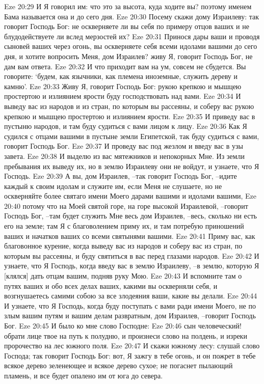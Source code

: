Eze 20:29  И Я говорил им: что это за высота, куда ходите вы? поэтому именем Бама называется она и до сего дня.
Eze 20:30  Посему скажи дому Израилеву: так говорит Господь Бог: не оскверняете ли вы себя по примеру отцов ваших и не блудодействуете ли вслед мерзостей их?
Eze 20:31  Принося дары ваши и проводя сыновей ваших через огонь, вы оскверняете себя всеми идолами вашими до сего дня, и хотите вопросить Меня, дом Израилев? живу Я, говорит Господь Бог, не дам вам ответа.
Eze 20:32  И что приходит вам на ум, совсем не сбудется. Вы говорите: `будем, как язычники, как племена иноземные, служить дереву и камню'.
Eze 20:33  Живу Я, говорит Господь Бог: рукою крепкою и мышцею простертою и излиянием ярости буду господствовать над вами.
Eze 20:34  И выведу вас из народов и из стран, по которым вы рассеяны, и соберу вас рукою крепкою и мышцею простертою и излиянием ярости.
Eze 20:35  И приведу вас в пустыню народов, и там буду судиться с вами лицом к лицу.
Eze 20:36  Как Я судился с отцами вашими в пустыне земли Египетской, так буду судиться с вами, говорит Господь Бог.
Eze 20:37  И проведу вас под жезлом и введу вас в узы завета.
Eze 20:38  И выделю из вас мятежников и непокорных Мне. Из земли пребывания их выведу их, но в землю Израилеву они не войдут, и узнаете, что Я Господь.
Eze 20:39  А вы, дом Израилев, --так говорит Господь Бог, --идите каждый к своим идолам и служите им, если Меня не слушаете, но не оскверняйте более святаго имени Моего дарами вашими и идолами вашими,
Eze 20:40  потому что на Моей святой горе, на горе высокой Израилевой, --говорит Господь Бог, --там будет служить Мне весь дом Израилев, --весь, сколько ни есть его на земле; там Я с благоволением приму их, и там потребую приношений ваших и начатков ваших со всеми святынями вашими.
Eze 20:41  Приму вас, как благовонное курение, когда выведу вас из народов и соберу вас из стран, по которым вы рассеяны, и буду святиться в вас перед глазами народов.
Eze 20:42  И узнаете, что Я Господь, когда введу вас в землю Израилеву, --в землю, которую Я [клялся] дать отцам вашим, подняв руку Мою.
Eze 20:43  И вспомните там о путях ваших и обо всех делах ваших, какими вы оскверняли себя, и возгнушаетесь самими собою за все злодеяния ваши, какие вы делали.
Eze 20:44  И узнаете, что Я Господь, когда буду поступать с вами ради имени Моего, не по злым вашим путям и вашим делам развратным, дом Израилев, --говорит Господь Бог.
Eze 20:45  И было ко мне слово Господне:
Eze 20:46  сын человеческий! обрати лице твое на путь к полудню, и произнеси слово на полдень, и изреки пророчество на лес южного поля.
Eze 20:47  И скажи южному лесу: слушай слово Господа; так говорит Господь Бог: вот, Я зажгу в тебе огонь, и он пожрет в тебе всякое дерево зеленеющее и всякое дерево сухое; не погаснет пылающий пламень, и все будет опалено им от юга до севера.
